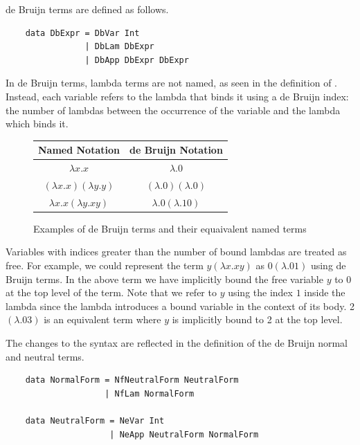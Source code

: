 
de Bruijn terms are defined as follows. \cite{deBruijnNotation}

\begin{lstlisting}
    data DbExpr = DbVar Int
                | DbLam DbExpr
                | DbApp DbExpr DbExpr
\end{lstlisting}

In de Bruijn terms, lambda terms are not named, as seen in the definition of . Instead, each variable refers to the lambda that binds it using a de Bruijn index: the number of lambdas between the occurrence of the variable and the lambda which binds it. 

\begin{figure}[h]
    \centering
    \begin{tabular}{ |c|c| } 
        \hline
        Named Notation & de Bruijn Notation \\
        \hline 
        $\lambda x.x$ & $\lambda . 0$ \\
        $(\lambda x. x)(\lambda y . y)$ & $(\lambda . 0)(\lambda . 0)$ \\
        $\lambda x. x (\lambda y. x y)$ & $\lambda . 0 (\lambda . 1 0 )$ \\
        \hline
    \end{tabular}
    \caption{Examples of de Bruijn terms and their equaivalent named terms}
    \label{fig:deBruijnExamples}
\end{figure}




Variables with indices greater than the number of bound lambdas are treated as free. For example, we could represent the term $y (\lambda x.xy)$ as $0 (\lambda .01)$ using de Bruijn terms. In the above term we have implicitly bound the free variable $y$ to 0 at the top level of the term. Note that we refer to $y$ using the index $1$ inside the lambda since the lambda introduces a bound variable in the context of its body. 2 $(\lambda . 0 3)$ is an equivalent term where $y$ is implicitly bound to 2 at the top level.

The changes to the syntax are reflected in the definition of the de Bruijn normal and neutral terms. 

\begin{lstlisting}
    data NormalForm = NfNeutralForm NeutralForm
                    | NfLam NormalForm

    data NeutralForm = NeVar Int
                     | NeApp NeutralForm NormalForm
\end{lstlisting}

